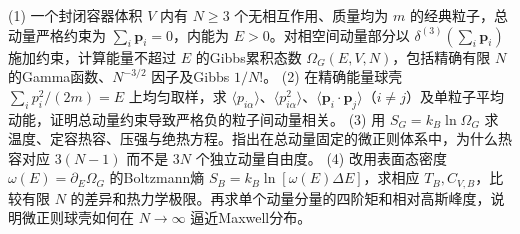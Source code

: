 (1) 一个封闭容器体积 \(V\) 内有 \(N\ge3\) 个无相互作用、质量均为 \(m\) 的经典粒子，总动量严格约束为 \(\sum_i\mathbf p_i=0\)，内能为 \(E>0\)。对相空间动量部分以 \(\delta^{(3)}(\sum_i\mathbf p_i)\) 施加约束，计算能量不超过 \(E\) 的Gibbs累积态数 \(\Omega_G(E,V,N)\)，包括精确有限 \(N\) 的Gamma函数、\(N^{-3/2}\) 因子及Gibbs \(1/N!\)。
(2) 在精确能量球壳 \(\sum_i p_i^2/(2m)=E\) 上均匀取样，求 \(\langle p_{i\alpha}\rangle\)、\(\langle p_{i\alpha}^2\rangle\)、\(\langle\mathbf p_i\cdot\mathbf p_j\rangle\)（\(i\ne j\)）及单粒子平均动能，证明总动量约束导致严格负的粒子间动量相关。
(3) 用 \(S_G=k_B\ln\Omega_G\) 求温度、定容热容、压强与绝热方程。指出在总动量固定的微正则体系中，为什么热容对应 \(3(N-1)\) 而不是 \(3N\) 个独立动量自由度。
(4) 改用表面态密度 \(\omega(E)=\partial_E\Omega_G\) 的Boltzmann熵 \(S_B=k_B\ln[\omega(E)\Delta E]\)，求相应 \(T_B,C_{V,B}\)，比较有限 \(N\) 的差异和热力学极限。再求单个动量分量的四阶矩和相对高斯峰度，说明微正则球壳如何在 \(N\to\infty\) 逼近Maxwell分布。
